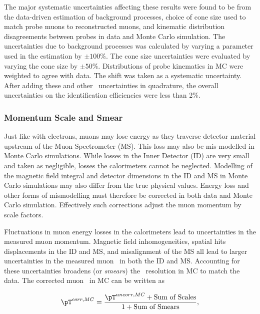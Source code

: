 \par The major systematic uncertainties affecting these results were found to be from the data-driven estimation 
of background processes, choice of cone size used to match probe muons to reconstructed muons, and kinematic 
distribution disagreements between probes in data and Monte Carlo simulation. The uncertainties due to background 
processes was calculated by varying a parameter used in the estimation by $\pm 100\%$. The cone size uncertainties 
were evaluated by varying the cone size by $\pm 50\%$. Distributions of probe kinematics in MC were weighted to 
agree with data. The shift was taken as a systematic uncertainty. After adding these and other~\cite{Aad:2016jkr} 
uncertainties in quadrature, the overall uncertainties on the identification efficiencies were less than 2\%. 
 

\subsubsection{Momentum Scale and Smear} 
\par Just like with electrons, muons may lose energy as they traverse detector material upstream 
of the Muon Spectrometer (MS). This loss may also be mis-modelled in Monte Carlo simulations. 
While losses in the Inner Detector (ID) are very small and taken as negligible, losses the calorimeters 
cannot be neglected. Modelling of the magnetic field integral and detector dimensions in the ID
 and MS in Monte Carlo simulations may also differ from the true physical values. Energy loss and other
forms of mismodelling must therefore be corrected in both data and Monte Carlo simulation. 
Effectively such corrections adjust the muon momentum by scale factors. 

\par Fluctuations in muon energy losses in the calorimeters  
lead to uncertainties in the measured muon momentum. Magnetic field 
inhomogeneities, spatial hits displacements in the ID and MS, and 
misalignment of the MS all lead to larger uncertainties in the measured 
muon \pT\ in both the ID and MS. Accounting for these uncertainties 
broadens (or {\it smears}) the \pT\ resolution in MC to match the data. The corrected muon \pT\ in 
MC can be written as

\begin{equation}
\pT^{corr,MC} = \frac{\pT^{uncorr,MC} + \text{Sum of Scales}}{1 + \text{Sum of Smears}},
\end{equation} 

